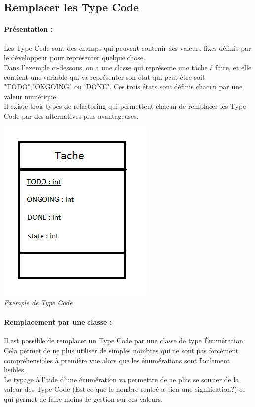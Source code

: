 \documentclass[a4paper,twoside,12pt,openright]{report}
\begin{document}
\newpage

\subsection{Remplacer les Type Code}
\paragraph{Présentation :}
Les Type Code sont des champs qui peuvent contenir des valeurs fixes définis par le développeur pour représenter quelque chose.\\
Dans l'exemple ci-dessous, on a une classe qui représente une tâche à faire, et elle contient une variable qui va représenter son état qui peut être soit "TODO","ONGOING" ou "DONE". Ces trois états sont définis chacun par une valeur numérique.\\
Il existe trois types de refactoring qui permettent chacun de remplacer les Type Code par des alternatives plus avantageuses.

\begin{center}
\includegraphics[scale=1]{Image/TypeCode.png}\\
\itshape{Exemple de Type Code}
\end{center}

\paragraph{Remplacement par une classe :}
Il est possible de remplacer un Type Code par une classe de type Énumération.\\
Cela permet de ne plus utiliser de simples nombres qui ne sont pas forcément compréhensibles à première vue alors que les énumérations sont facilement lisibles.\\
Le typage à l'aide d'une énumération va permettre de ne plus se soucier de la valeur des Type Code (Est ce que le nombre rentré a bien une signification?) ce qui permet de faire moins de gestion sur ces valeurs.
\end{document}
